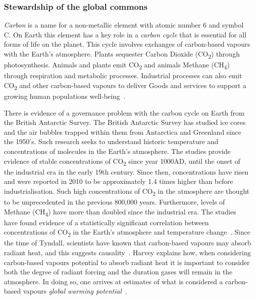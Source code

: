 \documentclass[11pt, oneside]{article}   	%
\begin{document}
\subsubsection{Stewardship of the global commons}
\emph{Carbon} is a name for a non-metallic element with atomic number 6 and symbol C.
On Earth this element has a key role in a \emph{carbon cycle} that is essential for all forms of life on the planet.
This cycle involves exchanges of carbon-based vapours with the Earth's atmosphere.
Plants sequester Carbon Dioxide (CO\textsubscript{2}) through photosynthesis.
Animals and plants emit CO\textsubscript{2} and animals Methane (CH\textsubscript{4}) through respiration and metabolic processes.
Industrial processes can also emit CO\textsubscript{2} and other carbon-based vapours to deliver Goods and services to support a growing human populations well-being~\cite{ng1}.\

There is evidence of a governance problem with the carbon cycle on Earth from the British Antarctic Survey.
The British Antarctic Survey has studied ice cores and the air bubbles trapped within them from Antarctica and Greenland since the 1950’s.
Such research seeks to understand historic temperature and concentrations of molecules in the Earth’s atmosphere.
The studies provide evidence of stable concentrations of CO\textsubscript{2} since year 1000AD, until the onset of the industrial era in the early 19th century.
Since then, concentrations have risen and were reported in 2010 to be approximately 1.4 times higher than before industrialisation.
Such high concentrations of CO\textsubscript{2} in the atmosphere are thought to be unprecedented in the previous 800,000 years. Furthermore, levels of Methane (CH\textsubscript{4}) have more than doubled since the industrial era.
The studies have found evidence of a statistically significant correlation between concentrations of CO\textsubscript{2} in the Earth’s atmosphere and temperature change~\cite{ba1}.
Since the time of Tyndall, scientists have known that carbon-based vapours may absorb radiant heat, and this suggests causality~\cite{td1}.
Harvey explains how, when considering carbon-based vapours potential to absorb radiant heat it is important to consider both the degree of radiant forcing and the duration gases will remain in the atmosphere.
In doing so, one arrives at estimates of what is considered a carbon-based vapours \emph{global warming potential}~\cite{dldh1}.\
\end{document}
